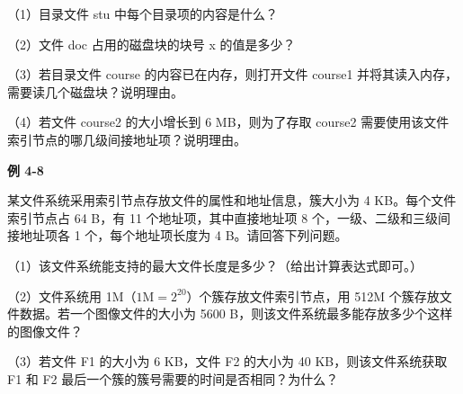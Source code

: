（1）目录文件 stu 中每个目录项的内容是什么？

（2）文件 doc 占用的磁盘块的块号 x 的值是多少？

（3）若目录文件 course 的内容已在内存，则打开文件 course1 并将其读入内存，需要读几个磁盘块？说明理由。

（4）若文件 course2 的大小增长到 6 MB，则为了存取 course2 需要使用该文件索引节点的哪几级间接地址项？说明理由。

\par\medskip{}\noindent\hypertarget{OS04-E08}{}\label{OS04-E08}\textbf{例 4-8}\par\nobreak\smallskip

某文件系统采用索引节点存放文件的属性和地址信息，簇大小为 4 KB。每个文件索引节点占 64 B，有 11 个地址项，其中直接地址项 8 个，一级、二级和三级间接地址项各 1 个，每个地址项长度为 4 B。请回答下列问题。

（1）该文件系统能支持的最大文件长度是多少？（给出计算表达式即可。）

（2）文件系统用 1M（\(1\mathrm{M}=2^{20}\)）个簇存放文件索引节点，用 512M 个簇存放文件数据。若一个图像文件的大小为 5600 B，则该文件系统最多能存放多少个这样的图像文件？

（3）若文件 F1 的大小为 6 KB，文件 F2 的大小为 40 KB，则该文件系统获取 F1 和 F2 最后一个簇的簇号需要的时间是否相同？为什么？
